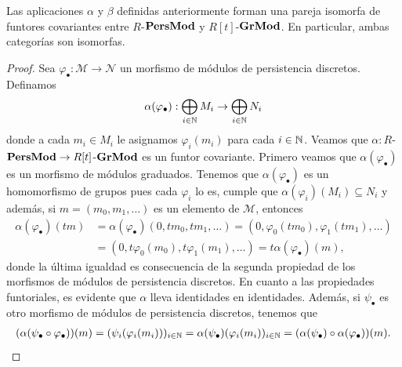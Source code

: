 \begin{lema}
	\label{lem:repr-carlsson-no-finito} Las aplicaciones $\alpha$ y $\beta$ definidas
	anteriormente forman una pareja isomorfa de funtores covariantes entre $R$-$\mathbf{PersMod}$ y $R[t]$-$\mathbf{GrMod}$. En particular, ambas categorías son isomorfas.
\end{lema}
\begin{proof}
	Sea $\varphi_{\bullet} : \mathcal{M}\to \mathcal{N}$ un morfismo de módulos de
	persistencia discretos. Definamos
	\[
	\alpha(\varphi_{\bullet}) : \bigoplus_{i \in \mathbb{N}}M_{i} \to \bigoplus_{i \in
		\mathbb{N}}N_{i}
	\]
	donde a cada $m_{i} \in M_{i}$ le asignamos $\varphi_{i}(m_{i})$ para cada
	$i \in \mathbb{N}$. Veamos que $\alpha : R$-$\mathbf{PersMod}\to R[t]$-$\mathbf{GrMod}$ es un
	funtor covariante. Primero veamos que $\alpha(\varphi_{\bullet})$ es un
	morfismo de módulos graduados. Tenemos que $\alpha(\varphi_{\bullet})$ es un homomorfismo
	de grupos pues cada $\varphi_{i}$ lo es, cumple que
	$\alpha(\varphi_{i})(M_{i}) \subseteq N_{i}$ y además, si $m = (m_{0}, m_{1}, \ldots
	)$ es un elemento de $\mathcal{M}$, entonces
	\begin{align*}
		\alpha(\varphi_{\bullet})(tm) & = \alpha(\varphi_{\bullet})(0, tm_{0}, tm_{1}, \ldots) = (0, \varphi_{0}(tm_{0}), \varphi_{1}(tm_{1}), \ldots) \\
		& = (0, t\varphi_{0}(m_{0}), t\varphi_{1}(m_{1}), \ldots) = t\alpha(\varphi_{\bullet})(m),
	\end{align*}
	donde la última igualdad es consecuencia de la segunda propiedad de los
	morfismos de módulos de persistencia discretos. En cuanto a las propiedades funtoriales,
	es evidente que $\alpha$ lleva identidades en identidades. Además, si
	$\psi_{\bullet}$ es otro morfismo de módulos de persistencia discretos, tenemos
	que
	\begin{align*}
		(\alpha(\psi_{\bullet} \circ \varphi_{\bullet}))(m) = (\psi_{i}(\varphi_{i}(m_{i})))_{i \in \mathbb{N}}= \alpha (\psi_{\bullet})(\varphi_{i}(m_{i}))_{i \in \mathbb{N}}= (\alpha(\psi_{\bullet}) \circ \alpha(\varphi_{\bullet}))(m).
	\end{align*}
	

\end{proof}
